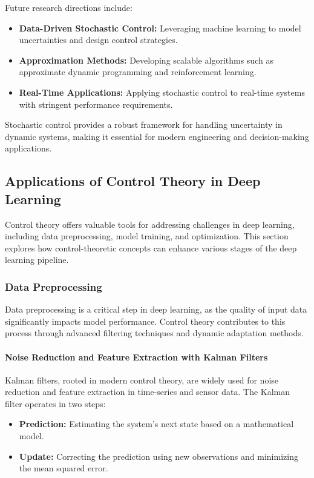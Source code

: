 \documentclass{IEEEojcsys}
\begin{document}
Future research directions include:
\begin{itemize}
    \item \textbf{Data-Driven Stochastic Control:} Leveraging machine learning to model uncertainties and design control strategies.
    \item \textbf{Approximation Methods:} Developing scalable algorithms such as approximate dynamic programming and reinforcement learning.
    \item \textbf{Real-Time Applications:} Applying stochastic control to real-time systems with stringent performance requirements.
\end{itemize}

Stochastic control provides a robust framework for handling uncertainty in dynamic systems, making it essential for modern engineering and decision-making applications.

\subsection{Applications of Control Theory in Deep Learning}
Control theory offers valuable tools for addressing challenges in deep learning, including data preprocessing, model training, and optimization. This section explores how control-theoretic concepts can enhance various stages of the deep learning pipeline.

\subsubsection{Data Preprocessing}
Data preprocessing is a critical step in deep learning, as the quality of input data significantly impacts model performance. Control theory contributes to this process through advanced filtering techniques and dynamic adaptation methods.

\paragraph{Noise Reduction and Feature Extraction with Kalman Filters}
Kalman filters, rooted in modern control theory, are widely used for noise reduction and feature extraction in time-series and sensor data. The Kalman filter operates in two steps:
\begin{itemize}
    \item \textbf{Prediction:} Estimating the system's next state based on a mathematical model.
    \item \textbf{Update:} Correcting the prediction using new observations and minimizing the mean squared error.
\end{itemize}
\end{document}
